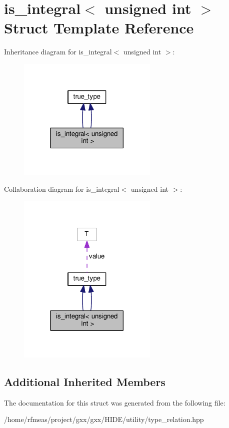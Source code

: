 \hypertarget{structis__integral_3_01unsigned_01int_01_4}{}\section{is\+\_\+integral$<$ unsigned int $>$ Struct Template Reference}
\label{structis__integral_3_01unsigned_01int_01_4}


Inheritance diagram for is\+\_\+integral$<$ unsigned int $>$\+:
\nopagebreak
\begin{figure}[H]
\begin{center}
\leavevmode
\includegraphics[width=189pt]{structis__integral_3_01unsigned_01int_01_4__inherit__graph}
\end{center}
\end{figure}


Collaboration diagram for is\+\_\+integral$<$ unsigned int $>$\+:
\nopagebreak
\begin{figure}[H]
\begin{center}
\leavevmode
\includegraphics[width=189pt]{structis__integral_3_01unsigned_01int_01_4__coll__graph}
\end{center}
\end{figure}
\subsection*{Additional Inherited Members}


The documentation for this struct was generated from the following file\+:\begin{DoxyCompactItemize}
\item 
/home/rfmeas/project/gxx/gxx/\+H\+I\+D\+E/utility/type\+\_\+relation.\+hpp\end{DoxyCompactItemize}
